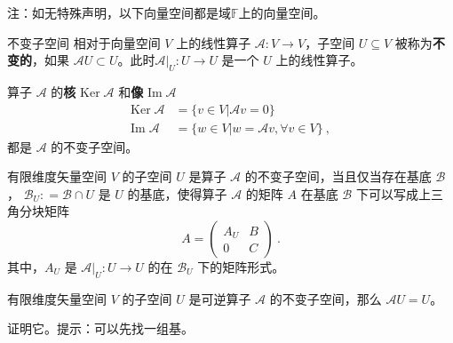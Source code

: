 


注：如无特殊声明，以下向量空间都是域$\mathbb{F}$上的向量空间。

\begin{definition}{不变子空间}
相对于向量空间 $V$ 上的线性算子 $\mathcal{A}: V \rightarrow V$，子空间 $U \subseteq V$ 被称为\textbf{不变的}，如果 $\mathcal{A} U \subset U$。此时$\mathcal{A}|_U: U \to U$ 是一个 $U$ 上的线性算子。
\end{definition}

\begin{example}{}
算子 $\mathcal{A}$ 的\textbf{核} $\mathrm{Ker}\;\mathcal A$ 和\textbf{像} $\mathrm{Im}\;\mathcal{A}$
\begin{equation}\label{eq_InvSP_3}
\begin{aligned}
\mathrm{Ker}\;\mathcal{A}&=\{ v\in V|\mathcal{A} v= 0\}\\
\mathrm{Im}\;\mathcal{A}&=\{ w\in V| w=\mathcal{A} v,\forall v\in V\}~,
\end{aligned}
\end{equation}
都是 $\mathcal A$ 的不变子空间。
\end{example}

\begin{theorem}{}
有限维度矢量空间 $V$ 的子空间 $U$ 是算子 $\mathcal{A}$ 的不变子空间，当且仅当存在基底 $\mathcal{B}$， $\mathcal{B}_U: = \mathcal{B} \cap U$ 是 $U$ 的基底，使得算子 $\mathcal{A}$ 的矩阵 $A$ 在基底 $\mathcal{B}$ 下可以写成上三角分块矩阵
\begin{equation}
A = \begin{pmatrix}
A_U & B\\
0 & C
\end{pmatrix}~.
\end{equation}
其中，$A_U$ 是 $\mathcal{A}|_{U}: U \to U$ 的在 $\mathcal{B}_U$ 下的矩阵形式。
\end{theorem}

\begin{theorem}{}
有限维度矢量空间 $V$ 的子空间 $U$ 是可逆算子 $\mathcal{A}$ 的不变子空间，那么 $\mathcal{A} U = U$。
\end{theorem}
\begin{exercise}{}
证明它。提示：可以先找一组基。
\end{exercise}

